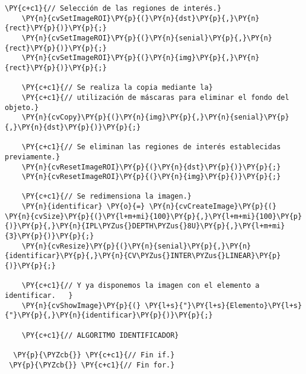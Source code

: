 \begin{Verbatim}[commandchars=\\\{\}]
    \PY{c+c1}{// Selección de las regiones de interés.}
    \PY{n}{cvSetImageROI}\PY{p}{(}\PY{n}{dst}\PY{p}{,}\PY{n}{rect}\PY{p}{)}\PY{p}{;}
    \PY{n}{cvSetImageROI}\PY{p}{(}\PY{n}{senial}\PY{p}{,}\PY{n}{rect}\PY{p}{)}\PY{p}{;}
    \PY{n}{cvSetImageROI}\PY{p}{(}\PY{n}{img}\PY{p}{,}\PY{n}{rect}\PY{p}{)}\PY{p}{;}
    
    \PY{c+c1}{// Se realiza la copia mediante la}
    \PY{c+c1}{// utilización de máscaras para eliminar el fondo del objeto.}
    \PY{n}{cvCopy}\PY{p}{(}\PY{n}{img}\PY{p}{,}\PY{n}{senial}\PY{p}{,}\PY{n}{dst}\PY{p}{)}\PY{p}{;}

    \PY{c+c1}{// Se eliminan las regiones de interés establecidas previamente.}
    \PY{n}{cvResetImageROI}\PY{p}{(}\PY{n}{dst}\PY{p}{)}\PY{p}{;}
    \PY{n}{cvResetImageROI}\PY{p}{(}\PY{n}{img}\PY{p}{)}\PY{p}{;}
    
    \PY{c+c1}{// Se redimensiona la imagen.}
    \PY{n}{identificar} \PY{o}{=} \PY{n}{cvCreateImage}\PY{p}{(} \PY{n}{cvSize}\PY{p}{(}\PY{l+m+mi}{100}\PY{p}{,}\PY{l+m+mi}{100}\PY{p}{)}\PY{p}{,}\PY{n}{IPL\PYZus{}DEPTH\PYZus{}8U}\PY{p}{,}\PY{l+m+mi}{3}\PY{p}{)}\PY{p}{;}
    \PY{n}{cvResize}\PY{p}{(}\PY{n}{senial}\PY{p}{,}\PY{n}{identificar}\PY{p}{,}\PY{n}{CV\PYZus{}INTER\PYZus{}LINEAR}\PY{p}{)}\PY{p}{;}
    
    \PY{c+c1}{// Y ya disponemos la imagen con el elemento a identificar.   }
    \PY{n}{cvShowImage}\PY{p}{(} \PY{l+s}{"}\PY{l+s}{Elemento}\PY{l+s}{"}\PY{p}{,}\PY{n}{identificar}\PY{p}{)}\PY{p}{;}

    \PY{c+c1}{// ALGORITMO IDENTIFICADOR}

  \PY{p}{\PYZcb{}} \PY{c+c1}{// Fin if.}
 \PY{p}{\PYZcb{}} \PY{c+c1}{// Fin for.}
\end{Verbatim}
